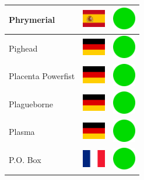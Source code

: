 \documentclass[12pt, a4paper, twoside]{report}
\begin{document}
\begin{center}
\begin{longtable}{|p{5cm}|p{2cm}|p{2cm}|}
Phrymerial & \includegraphics[width=1cm]{4x3/es} & \includegraphics[width=1cm]{likes/y} \\ \hline
Pighead & \includegraphics[width=1cm]{4x3/de} & \includegraphics[width=1cm]{likes/y} \\ \hline
Placenta Powerfist & \includegraphics[width=1cm]{4x3/de} & \includegraphics[width=1cm]{likes/y} \\ \hline
Plagueborne & \includegraphics[width=1cm]{4x3/de} & \includegraphics[width=1cm]{likes/y} \\ \hline
Plasma & \includegraphics[width=1cm]{4x3/de} & \includegraphics[width=1cm]{likes/y} \\ \hline
P.O. Box & \includegraphics[width=1cm]{4x3/fr} & \includegraphics[width=1cm]{likes/y} \\ \hline

\end{longtable}
\end{center}
\end{document}
